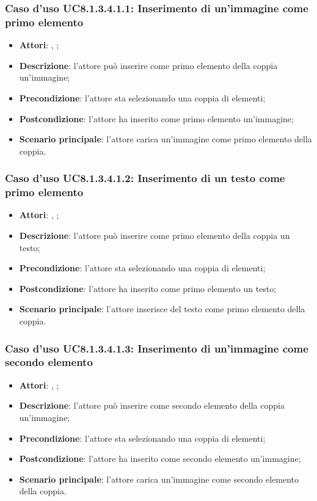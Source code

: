 		\subsubsection{Caso d'uso UC8.1.3.4.1.1: Inserimento di un'immagine come primo elemento}
		\label{UC8.1.3.4.1.1}
		\begin{itemize}
			\item \textbf{Attori}: \uau, \uaupro;
			\item \textbf{Descrizione}: l'attore può inserire come primo elemento della coppia un'immagine;
			\item \textbf{Precondizione}: l'attore sta selezionando una coppia di elementi;
			\item \textbf{Postcondizione}: l'attore ha inserito come primo elemento un'immagine;
			\item \textbf{Scenario principale}: l'attore carica un'immagine come primo elemento della coppia.
		\end{itemize}
		
		\subsubsection{Caso d'uso UC8.1.3.4.1.2: Inserimento di un testo come primo elemento}
		\label{UC8.1.3.4.1.2}
		\begin{itemize}
			\item \textbf{Attori}: \uau, \uaupro;
			\item \textbf{Descrizione}: l'attore può inserire come primo elemento della coppia un testo;
			\item \textbf{Precondizione}: l'attore sta selezionando una coppia di elementi;
			\item \textbf{Postcondizione}: l'attore ha inserito come primo elemento un testo;
			\item \textbf{Scenario principale}: l'attore inserisce del testo come primo elemento della coppia.
		\end{itemize}
		
			\subsubsection{Caso d'uso UC8.1.3.4.1.3: Inserimento di un'immagine come secondo elemento}
		\label{UC8.1.3.4.1.3}
		\begin{itemize}
			\item \textbf{Attori}: \uau, \uaupro;
			\item \textbf{Descrizione}: l'attore può inserire come secondo elemento della coppia un'immagine;
			\item \textbf{Precondizione}: l'attore sta selezionando una coppia di elementi;
			\item \textbf{Postcondizione}: l'attore ha inserito come secondo elemento un'immagine;
			\item \textbf{Scenario principale}: l'attore carica un'immagine come secondo elemento della coppia.
		\end{itemize}
		
